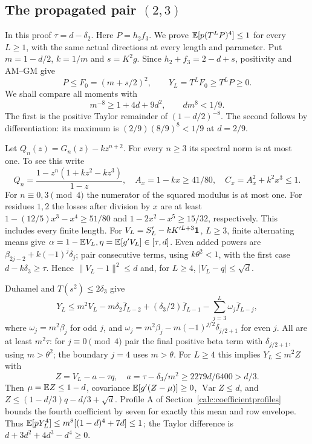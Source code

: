 \subsection[The propagated pair (2,3)]{The propagated pair $(2,3)$}\label{loc:S23}
In this proof $\tau=d-\delta_{2}$.
Here $P=h_2f_3$. We prove $\mathbb E[p(T^LP)^4]\le1$ for every $L\ge1$,
with the same actual directions at every length and parameter.
Put $m=1-d/2$, $k=1/m$ and $s=K^2g$. Since
$h_2+f_3=2-d+s$, positivity and AM--GM give
\[
 P\le F_0=(m+s/2)^2,\qquad Y_L=T^LF_0\ge T^LP\ge0.
\]
We shall compare all moments with
\begin{equation}\label{eq:compact-23-taylor}
 m^{-8}\ge1+4d+9d^2,\qquad dm^8<1/9.
\end{equation}
The first is the positive Taylor remainder of $(1-d/2)^{-8}$.
The second follows by differentiation: its maximum is
$(2/9)(8/9)^8<1/9$ at $d=2/9$.

Let $Q_n(z)=G_n(z)-kz^{n+2}$. For every $n\ge3$ its spectral norm
is at most one. To see this write
\[
 Q_n=\frac{1-z^n(1+kz^2-kz^3)}{1-z},\quad
 A_x=1-kx\ge41/80,\quad C_x=A_x^2+k^2x^3\le1.
\]
For $n\equiv0,3\pmod4$ the numerator of the squared modulus is at most
one. For residues $1,2$ the losses after division by $x$ are at least
$1-(12/5)x^3-x^4\ge51/80$ and
$1-2x^2-x^5\ge15/32$, respectively. This includes every finite length.
For $V_L=S'_L-kK'^{L+3}\mathbf1$, $L\ge3$, finite alternating means give
$\alpha=1-\mathbb E V_L,\eta=\mathbb E[g'V_L]\in[\tau,d]$.
Even added powers are $\beta_{2j-2}+k(-1)^j\delta_{j}$; pair consecutive terms,
using $k\theta^2<1$, with the first case $d-k\delta_{3}\ge\tau$.
Hence $\|V_L-1\|^2\le d$ and, for $L\ge4$,
$|V_L-q|\le\sqrt d$.

Duhamel and $T(s^2)\le2\delta_{3}$ give
\[
 Y_L\le m^2V_L-m\delta_{2}\bar f_{L-2}+(\delta_{3}/2)\bar f_{L-1}
                 -\sum_{j=3}^L\omega_j\bar f_{L-j},
\]
where $\omega_j=m^2\beta_j$ for odd $j$, and
$\omega_j=m^2\beta_j-m(-1)^{j/2}\delta_{j/2+1}$ for even $j$.
All are at least $m^2\tau$: for $j\equiv0\pmod4$ pair the final
positive beta term with $\delta_{j/2+1}$, using $m>\theta^2$;
the boundary $j=4$ uses $m>\theta$.
For $L\ge4$ this implies $Y_L\le m^2Z$ with
\[
 Z=V_L-a-\tau q,\quad a=\tau-\delta_{3}/m^2\ge2279d/6400>d/3.
\]
Then $\mu=\mathbb E Z\le1-d$, covariance $\mathbb E[g'(Z-\mu)]\ge0$,
$\operatorname{Var}Z\le d$, and
$Z\le(1-d/3)q-d/3+\sqrt d$.
Profile A of Section~\ref{calc:coefficientprofiles} bounds the fourth
coefficient by seven for exactly this mean and row envelope.
Thus $\mathbb E[pY_L^4]\le m^8[(1-d)^4+7d]\le1$;
the Taylor difference is $d+3d^2+4d^3-d^4\ge0$.

